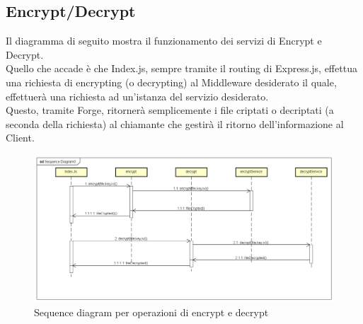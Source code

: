 		\subsection{Encrypt/Decrypt}
		Il diagramma di seguito mostra il funzionamento dei servizi di Encrypt e Decrypt.\\
		Quello che accade è che Index.js, sempre tramite il routing di Express.js, effettua una richiesta di encrypting (o decrypting) al Middleware desiderato il quale,
		effettuerà una richiesta ad un'istanza del servizio desiderato.\\
		Questo, tramite Forge, ritornerà semplicemente i file criptati o decriptati (a seconda della richiesta) al chiamante che gestirà
		il ritorno dell'informazione al Client.\\ 			
		\begin{figure}[h!]
			\centering
			\includegraphics[scale=0.3]{Sequence/wncryptDecrypt.png}
			\caption{Sequence diagram per operazioni di encrypt e decrypt}
		\end{figure}
